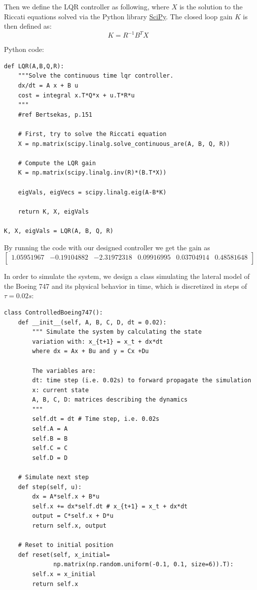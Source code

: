 Then we define the LQR controller as following, where $X$ is the solution to the Riccati equations solved via the Python library \href{https://www.scipy.org/}{SciPy}. The closed loop gain $K$ is then defined as:
\begin{equation}
    K = R^{-1} B^T X
\end{equation}

Python code:
\begin{verbatim}
def LQR(A,B,Q,R):
    """Solve the continuous time lqr controller.
    dx/dt = A x + B u
    cost = integral x.T*Q*x + u.T*R*u
    """
    #ref Bertsekas, p.151

    # First, try to solve the Riccati equation
    X = np.matrix(scipy.linalg.solve_continuous_are(A, B, Q, R))

    # Compute the LQR gain
    K = np.matrix(scipy.linalg.inv(R)*(B.T*X))

    eigVals, eigVecs = scipy.linalg.eig(A-B*K)

    return K, X, eigVals

K, X, eigVals = LQR(A, B, Q, R)

\end{verbatim}

By running the code with our designed controller we get the gain as
\begin{equation}
    \begin{bmatrix}
         1.05951967 &-0.19104882 &-2.31972318 & 0.09916995 & 0.03704914 & 0.48581648\\
    \end{bmatrix}
\end{equation}

In order to simulate the system, we design a class simulating the lateral model of the Boeing 747 and its physical behavior in time, which is discretized in steps of $\tau = 0.02s$:

\begin{verbatim}
class ControlledBoeing747():
    def __init__(self, A, B, C, D, dt = 0.02):
        """ Simulate the system by calculating the state 
        variation with: x_{t+1} = x_t + dx*dt
        where dx = Ax + Bu and y = Cx +Du
        
        The variables are:
        dt: time step (i.e. 0.02s) to forward propagate the simulation
        x: current state
        A, B, C, D: matrices describing the dynamics
        """
        self.dt = dt # Time step, i.e. 0.02s
        self.A = A
        self.B = B
        self.C = C
        self.D = D
    
    # Simulate next step
    def step(self, u):
        dx = A*self.x + B*u
        self.x += dx*self.dt # x_{t+1} = x_t + dx*dt
        output = C*self.x + D*u
        return self.x, output
    
    # Reset to initial position
    def reset(self, x_initial= 
              np.matrix(np.random.uniform(-0.1, 0.1, size=6)).T):
        self.x = x_initial
        return self.x
\end{verbatim}
 
